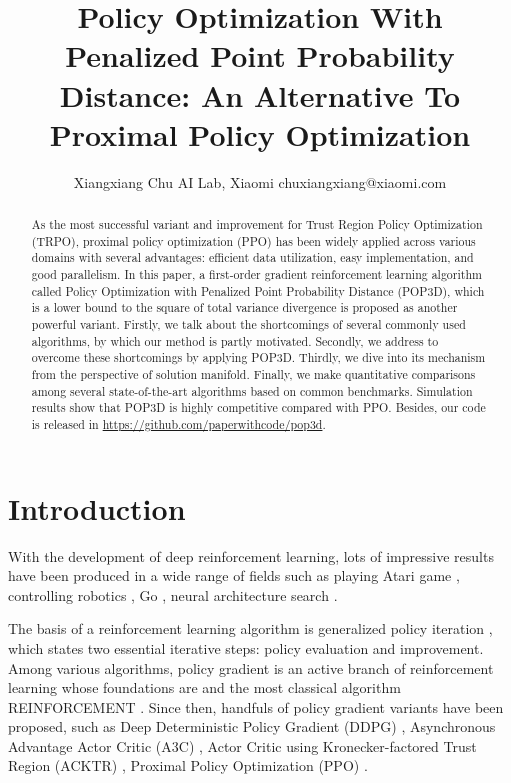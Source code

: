 \documentclass{article}
\title{Policy Optimization With Penalized Point Probability Distance: An Alternative To Proximal Policy Optimization}
\author{
    Xiangxiang Chu
    \affiliations
    AI Lab, Xiaomi \emails
    chuxiangxiang@xiaomi.com
}
\begin{document}
\maketitle

\begin{abstract}
 As the most successful variant and improvement for Trust Region Policy Optimization (TRPO), proximal policy optimization (PPO) has been widely applied across various domains with several advantages: efficient data utilization, easy implementation, and good parallelism. In this paper, a first-order gradient reinforcement learning algorithm called Policy Optimization with Penalized Point Probability Distance (POP3D), which is a lower bound to the square of total variance divergence is proposed as another powerful variant. Firstly, we talk about the shortcomings of several commonly used algorithms, by which our method is partly motivated. Secondly, we address to overcome these shortcomings by applying POP3D. Thirdly, we dive into its mechanism from the perspective of solution manifold. Finally, we make quantitative comparisons among several state-of-the-art algorithms based on common benchmarks. Simulation results show that POP3D is highly competitive compared with PPO. Besides, our code is released in \url{https://github.com/paperwithcode/pop3d}.
  
\end{abstract}

\section{Introduction}

With the development of deep reinforcement learning, lots of impressive results have been produced in a wide range of fields such as playing Atari game \cite{mnih2015human,hessel2017rainbow},  controlling robotics \cite{lillicrap2015continuous}, Go \cite{silver2017mastering}, neural architecture search \cite{tan2018mnasnet,pham2018efficient}. 



The basis of a reinforcement learning algorithm is generalized policy iteration \cite{sutton2018reinforcement}, which states  two essential iterative steps: policy evaluation and improvement. Among various algorithms, policy gradient is an active branch of reinforcement learning whose foundations are     and the most classical  algorithm REINFORCEMENT \cite{sutton2018reinforcement}. Since then, handfuls of policy  gradient variants have been proposed, such as  Deep Deterministic Policy Gradient (DDPG) \cite{lillicrap2015continuous}, Asynchronous Advantage Actor Critic (A3C) \cite{2016arXiv160201783M}, Actor Critic using Kronecker-factored Trust Region (ACKTR) \cite{wu2017scalable}, Proximal Policy Optimization (PPO) \cite{2017arXiv170706347S}.
\end{document}
